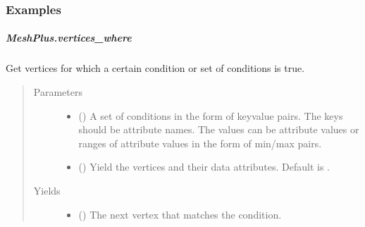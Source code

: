 \documentclass[letterpaper,10pt,english]{sphinxmanual}
\begin{document}
\begin{fulllineitems}
\begin{fulllineitems}
\subsubsection*{Examples}

\begin{sphinxVerbatim}[commandchars=\\\{\}]
\end{sphinxVerbatim}

\end{fulllineitems}



\subparagraph{MeshPlus.vertices\_where}
\label{\detokenize{api/generated/directional_clustering.mesh.MeshPlus.vertices_where:meshplus-vertices-where}}\label{\detokenize{api/generated/directional_clustering.mesh.MeshPlus.vertices_where::doc}}

\begin{fulllineitems}
\label{\detokenize{api/generated/directional_clustering.mesh.MeshPlus.vertices_where:directional_clustering.mesh.MeshPlus.vertices_where}}
Get vertices for which a certain condition or set of conditions is true.
\begin{quote}\begin{description}
\item[{Parameters}] \leavevmode\begin{itemize}
\item {} 
 () \textendash{} A set of conditions in the form of key\sphinxhyphen{}value pairs.
The keys should be attribute names. The values can be attribute
values or ranges of attribute values in the form of min/max pairs.

\item {} 
 () \textendash{} Yield the vertices and their data attributes.
Default is .

\end{itemize}

\item[{Yields}] \leavevmode\begin{itemize}
\item {} 
 () \textendash{} The next vertex that matches the condition.


\end{itemize}
\end{description}
\end{quote}
\end{fulllineitems}
\end{fulllineitems}
\end{document}
